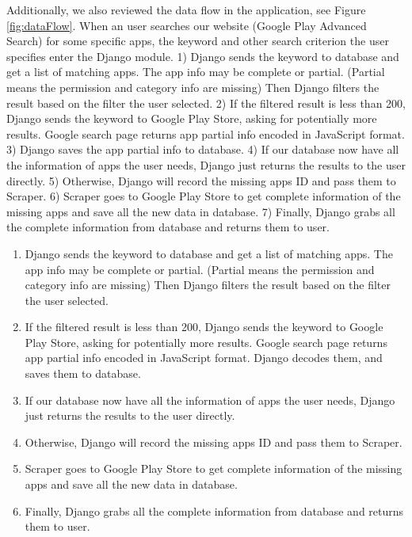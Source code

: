 \documentclass[12pt, a4paper]{article}
\begin{document}
Additionally, we also reviewed the data flow in the application, see Figure \ref{fig:dataFlow}. When an user searches our website (Google Play Advanced Search) for some specific apps, the keyword and other search criterion the user specifies enter the Django module. 1) Django sends the keyword to database and get a list of matching apps. The app info may be complete or partial. (Partial means the permission and category info are missing) Then Django filters the result based on the filter the user selected. 2) If the filtered result is less than 200, Django sends the keyword to Google Play Store, asking for potentially more results. Google search page returns app partial info encoded in JavaScript format. 3) Django saves the app partial info to database. 4) If our database now have all the information of apps the user needs, Django just returns the results to the user directly. 5) Otherwise, Django will record the missing apps ID and pass them to Scraper. 6) Scraper goes to Google Play Store to get complete information of the missing apps and save all the new data in database. 7) Finally, Django grabs all the complete information from database and returns them to user.

\begin{enumerate}
    \item  Django sends the keyword to database and get a list of matching apps. The app info may be complete or partial. (Partial means the permission and category info are missing) Then Django filters the result based on the filter the user selected.
    \item If the filtered result is less than 200, Django sends the keyword to Google Play Store, asking for potentially more results. Google search page returns app partial info encoded in JavaScript format. Django decodes them, and saves them to database.
    \item If our database now have all the information of apps the user needs, Django just returns the results to the user directly. 
    \item Otherwise, Django will record the missing apps ID and pass them to Scraper.
    \item Scraper goes to Google Play Store to get complete information of the missing apps and save all the new data in database.
    \item Finally, Django grabs all the complete information from database and returns them to user.
\end{enumerate}
\end{document}
